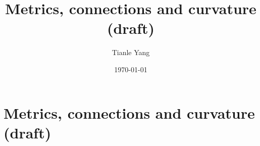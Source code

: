 \documentclass{noteformyself}
\title{Metrics, connections and curvature (draft)}
\author{Tianle Yang}
\date{\today}
\begin{document}
    \maketitle
    \section{Metrics, connections and curvature (draft)}




\end{document}
